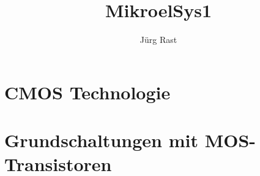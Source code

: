 \documentclass[titlepage=true]{scrartcl}
\title{MikroelSys1}
\author{Jürg Rast}
\begin{document}

\tableofcontents
\newpage

\section{CMOS Technologie}





\section{Grundschaltungen mit MOS-Transistoren}















%

\end{document}
